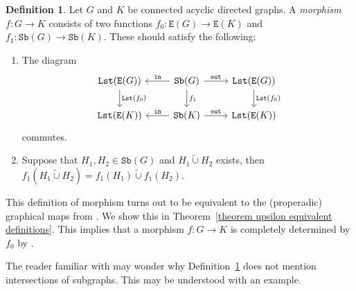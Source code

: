 \documentclass{amsart}
\numberwithin{theorem}{subsection}
\theoremstyle{definition}
\newtheorem{definition}[theorem]{Definition}
\newcommand{\lists}{\mathtt{Lst}}
\newcommand{\sub}{\mathtt{Sb}}
\newcommand{\out}{\mathtt{out}}
\newcommand{\inp}{\mathtt{in}}
\newcommand{\edge}{\mathtt{E}}
\newcommand{\strcup}{\mathbin{\tilde \cup}}
\begin{document}
\begin{definition}\label{definition complete morphism}
Let $G$ and $K$ be connected acyclic directed graphs.
A \emph{morphism} $f \colon G\to K$ consists of two functions $f_0 \colon \edge(G) \to \edge(K)$ and $f_1 \colon \sub(G) \to \sub(K)$.
These should satisfy the following:
\begin{enumerate}
	\item The diagram
\[
\begin{tikzcd}
\lists (\edge(G))  \dar["\lists(f_0)"] &\sub(G)  \dar["f_1"] \lar["\inp" swap] \rar["\out"]& \lists (\edge(G))  \dar["\lists(f_0)"] \\
\lists (\edge(K))  & \sub(K) \lar["\inp" swap] \rar["\out"] & \lists (\edge(K))
\end{tikzcd}
\]
	commutes. \label{definition complete morphism preservation of ports}
	\item Suppose that $H_1, H_2 \in \sub(G)$ and $H_1 \strcup H_2$ exists, then $f_1(H_1 \strcup H_2) = f_1 (H_1) \strcup f_1 (H_2).$ \label{definition complete morphism intersection union}

\end{enumerate}
\end{definition}

This definition of morphism turns out to be equivalent to the (properadic) graphical maps from \cite[Definition 6.46]{hrybook}.
We show this in Theorem~\ref{theorem upsilon equivalent definitions}.
This implies that a morphism $f \colon G\to K$ is completely determined by $f_0$ by \cite[Corollary 6.62]{hrybook}.

The reader familiar with \cite[Definition 1.12]{HackneyRobertsonYau:HCO} may wonder why Definition~\ref{definition complete morphism} does not mention intersections of subgraphs.
This may be understood with an example.
\end{document}
